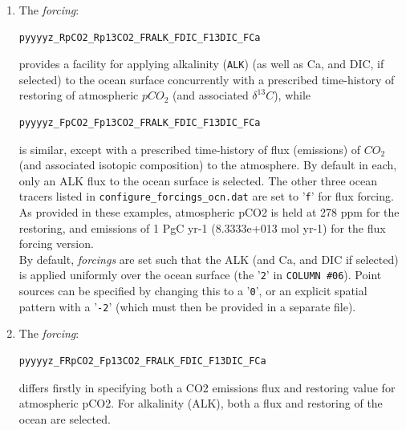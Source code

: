 \documentclass[11pt,fleqn]{book} %
\begin{document}
\begin{enumerate}[noitemsep]

\vspace{1mm}
\item The \textit{forcing}:
\vspace{-1mm}\small\begin{verbatim}
pyyyyz_RpCO2_Rp13CO2_FRALK_FDIC_F13DIC_FCa
\end{verbatim}\normalsize\vspace{-1mm}
provides a facility for applying alkalinity (\texttt{ALK}) (as well as Ca, and DIC, if selected) to the ocean surface concurrently with a prescribed time-history of restoring of atmospheric \(pCO_{2}\) (and associated \(\delta^{13}C\)), while
\vspace{-1mm}\small\begin{verbatim}
pyyyyz_FpCO2_Fp13CO2_FRALK_FDIC_F13DIC_FCa
\end{verbatim}\normalsize\vspace{-1mm}
is similar, except with a prescribed time-history of flux (emissions) of \(CO_{2}\) (and associated isotopic composition) to the atmosphere.
By default in each, only an ALK flux to the ocean surface is selected. The other three ocean tracers listed in \texttt{configure\_forcings\_ocn.dat} are set to '\texttt{f}' for flux forcing. As provided in these examples, atmospheric pCO2 is held at 278 ppm for the restoring, and emissions of 1 PgC yr-1 (8.3333e+013 mol yr-1) for the flux forcing version.
\\ By default, \textit{forcings} are set such that the ALK (and Ca, and DIC if selected) is applied uniformly over the ocean surface (the '\texttt{2}' in \texttt{COLUMN \#06}). Point sources can be specified by changing this to a '\texttt{0}', or an explicit spatial pattern with a '\texttt{-2}' (which must then be provided in a separate file).

\vspace{1mm}
\item The \textit{forcing}:
\vspace{-1mm}\small\begin{verbatim}
pyyyyz_FRpCO2_Fp13CO2_FRALK_FDIC_F13DIC_FCa
\end{verbatim}\normalsize\vspace{-1mm}
differs firstly in specifying both a CO2 emissions flux and restoring value for atmospheric pCO2. For alkalinity (ALK), both a flux and restoring of the ocean are selected.


\end{enumerate}
\end{document}
